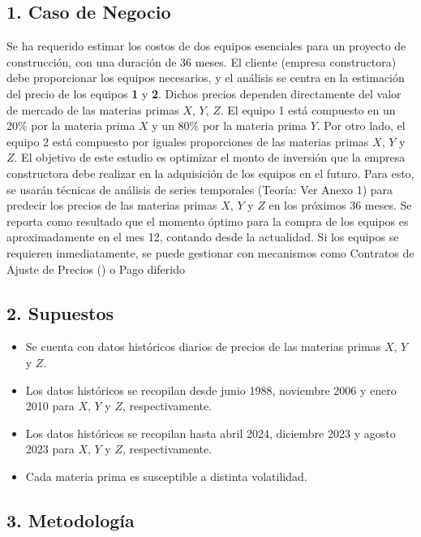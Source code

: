 \subsection{1. Caso de Negocio}\label{caso-de-negocio}

Se ha requerido estimar los costos de dos equipos esenciales para un
proyecto de construcción, con una duración de 36 meses. El cliente
(empresa constructora) debe proporcionar los equipos necesarios, y el
análisis se centra en la estimación del precio de los equipos \textbf{1}
y \textbf{2}. Dichos precios dependen directamente del valor de mercado
de las materias primas \(X\), \(Y\), \(Z\). El equipo 1 está compuesto
en un 20\% por la materia prima \(X\) y un 80\% por la materia prima
\(Y\). Por otro lado, el equipo 2 está compuesto por iguales
proporciones de las materias primas \(X\), \(Y\) y \(Z\). El objetivo de
este estudio es optimizar el monto de inversión que la empresa
constructora debe realizar en la adquisición de los equipos en el
futuro. Para esto, se usarán técnicas de análisis de series temporales
(Teoría: Ver Anexo 1) para predecir los precios de las materias primas
\(X\), \(Y\) y \(Z\) en los próximos 36 meses. Se reporta como resultado
que el momento óptimo para la compra de los equipos es aproximadamente
en el mes 12, contando desde la actualidad. Si los equipos se requieren
inmediatamente, se puede gestionar con mecanismos como Contratos de
Ajuste de Precios () o Pago diferido

\subsection{2. Supuestos}\label{supuestos}

\begin{itemize}
\tightlist
\item
  Se cuenta con datos históricos diarios de precios de las materias
  primas \(X\), \(Y\) y \(Z\).
\item
  Los datos históricos se recopilan desde junio 1988, noviembre 2006 y
  enero 2010 para \(X\), \(Y\) y \(Z\), respectivamente.
\item
  Los datos históricos se recopilan hasta abril 2024, diciembre 2023 y
  agosto 2023 para \(X\), \(Y\) y \(Z\), respectivamente.
\item
  Cada materia prima es susceptible a distinta volatilidad.
\end{itemize}

\subsection{3. Metodología}\label{metodologuxeda}

